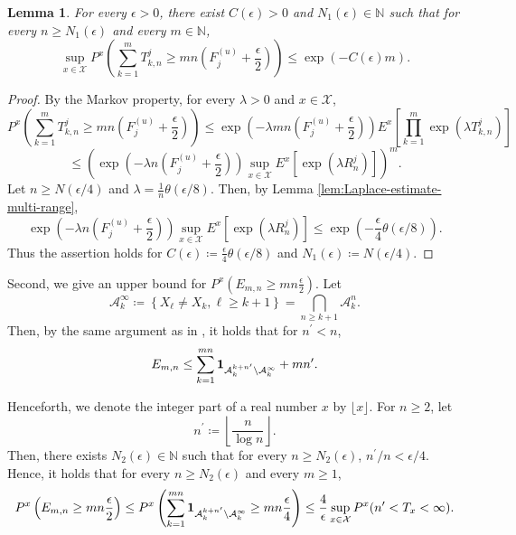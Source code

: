 \documentclass[a4paper, reqno, 11pt]{amsart}
\newtheorem{Lem}[Thm]{Lemma}
\theoremstyle{definition}
\begin{document}
\begin{Lem}\label{lem:upper-Markov-tail}
For every $\epsilon > 0$, there exist $C(\epsilon) > 0$  and $N_1 (\epsilon) \in \mathbb{N}$ such that 
for every $n \ge N_1 (\epsilon)$ and every $m \in \mathbb{N}$, 
\begin{equation*}\label{eq:multi-range-tail}
\sup_{x \in \mathcal{X}} P^x \left(  \sum_{k=1}^{m}   T^{j}_{k,n} \ge mn \left(F_j^{(u)} + \frac{\epsilon}{2} \right) \right)  \le \exp\left(-C(\epsilon) m \right). 
\end{equation*}
\end{Lem}

\begin{proof}
By the Markov property, for every $\lambda > 0$ and $x \in \mathcal{X}$, 
\[  P^x \left(  \sum_{k=1}^{m}   T^{j}_{k,n} \ge mn \left(F_j^{(u)} + \frac{\epsilon}{2} \right) \right) \le \exp\left(-\lambda mn \left(F_j^{(u)} + \frac{\epsilon}{2} \right) \right) E^x \left[ \prod_{k=1}^{m} \exp\left( \lambda T^{j}_{k,n}  \right)  \right] \]
\[ \le \left( \exp\left(-\lambda n \left(F_j^{(u)} + \frac{\epsilon}{2} \right) \right) \sup_{x \in \mathcal{X}} E^x \left[ \exp(\lambda R^j_n) \right] \right)^m. \]
Let $n \ge N(\epsilon/4)$ and $\lambda = \frac{1}{n} \theta(\epsilon/8)$. 
Then, by Lemma \ref{lem:Laplace-estimate-multi-range}, 
\[  \exp\left(-\lambda n \left(F_j^{(u)} + \frac{\epsilon}{2} \right) \right) \sup_{x \in \mathcal{X}} E^x \left[ \exp(\lambda R^j_n) \right] \le \exp\left(- \frac{\epsilon}{4} \theta(\epsilon/8)\right). \]
Thus the assertion holds for $\displaystyle C(\epsilon) \coloneqq \frac{\epsilon}{4} \theta(\epsilon/8)$ and $N_1 (\epsilon) \coloneqq N(\epsilon/4)$.
\end{proof}

Second, we give an upper bound for  $\displaystyle P^x \left( E_{m,n} \ge mn \frac{\epsilon}{2} \right)$. 
Let 
\[ \mathcal{A}_{k}^{\infty} \coloneqq \left\{X_{\ell} \ne X_k,  \ell \ge k+1 \right\} = \bigcap_{n \ge k+1} \mathcal{A}_{k}^n.\]  
Then, by the same argument as in \cite[Proof of Lemma]{Pitt1974}, 
it holds that for $n^{\prime} < n$, 
\[ E_{m,n} \le \sum_{k=1}^{mn} {\bf 1}_{\mathcal{A}_{k}^{k+n^{\prime}} \setminus \mathcal{A}_{k}^{\infty}} + mn^{\prime}. \]

Henceforth, we denote the integer part of a real number $x$ by $\lfloor x \rfloor$. 
For $n \ge 2$, let 
\begin{equation}\label{eq:def-n-prime}
n^{\prime} \coloneqq \left\lfloor \frac{n}{\log n} \right\rfloor. 
\end{equation}
Then, there exists $N_2 (\epsilon) \in \mathbb{N}$ such that for every $n \ge N_2 (\epsilon)$, $n^{\prime}/n < \epsilon/4$. 
Hence, it holds that for every $n \ge N_2 (\epsilon)$ and every $m \ge 1$, 
\begin{equation}\label{eq:Emn-upper} 
P^x \left( E_{m,n} \ge mn \frac{\epsilon}{2} \right) \le P^x \left(  \sum_{k=1}^{mn} {\bf 1}_{\mathcal{A}_{k}^{k+n^{\prime}} \setminus \mathcal{A}_{k}^{\infty}} \ge mn \frac{\epsilon}{4} \right) \le \frac{4}{\epsilon} \sup_{x \in \mathcal{X}} P^x (n^{\prime} < T_x < \infty). 
\end{equation}
\end{document}

